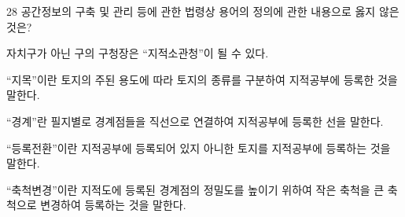 \begin{question}{28}
공간정보의 구축 및 관리 등에 관한 법령상 용어의 정의에 관한 내용으로 옳지 않은 것은?
\begin{choices}
  \item 자치구가 아닌 구의 구청장은 “지적소관청”이 될 수 있다.
  \item “지목”이란 토지의 주된 용도에 따라 토지의 종류를 구분하여 지적공부에 등록한 것을 말한다.
  \item “경계”란 필지별로 경계점들을 직선으로 연결하여 지적공부에 등록한 선을 말한다.
  \item “등록전환”이란 지적공부에 등록되어 있지 아니한 토지를 지적공부에 등록하는 것을 말한다.
  \item “축척변경”이란 지적도에 등록된 경계점의 정밀도를 높이기 위하여 작은 축척을 큰 축척으로 변경하여 등록하는 것을 말한다.
\end{choices}
\end{question}
